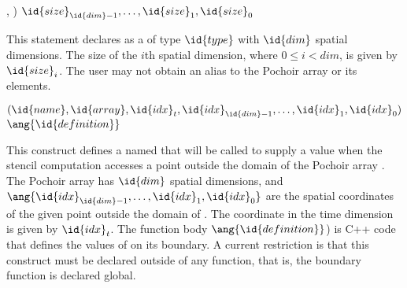 \begin{closeitemize}
\lstset{language=Pochoir_bf}
\item {}, ) \code{(}$\id{size}_{\id{dim}-1}, \ldots, \linebreak[0]\id{size}_1, \id{size}_0$\code{)}
\end{closeitemize}
This statement declares  as a  of type
$\id{type}$ with $\id{dim}$ spatial dimensions.  The size of the $i$th
spatial dimension, where $0 \leq i < dim$, is given by $\id{size}_i$.
The user may not obtain an alias to the Pochoir array or its elements.

\begin{closeitemize}
\lstset{language=Pochoir_bf}
\item {}$(\id{name}, \id{array}, \id{idx}_t, \linebreak[0]\id{idx}_{\id{dim} - 1},\linebreak[0] \ldots, \linebreak[0]\id{idx}_1, \id{idx}_0)$ \\
     \hspace*{1em} $\ang{\id{definition}}$\\
\end{closeitemize}
This construct defines a  named  that
will be called to supply a value when the stencil computation accesses
a point outside the domain of the Pochoir array .  The
Pochoir array  has $\id{dim}$ spatial dimensions, and
$\ang{\id{idx}_{\id{dim} - 1}, \ldots, \id{idx}_1, \id{idx}_0}$ are
the spatial coordinates of the given point outside the domain of
.  The coordinate in the time dimension is given by
$\id{idx}_t$.  The function body $\ang{\id{definition}}$) is {C++}
code that defines the values of  on its boundary.  A current
restriction is that this construct must be declared outside of any
function, that is, the boundary function is declared global.
  
